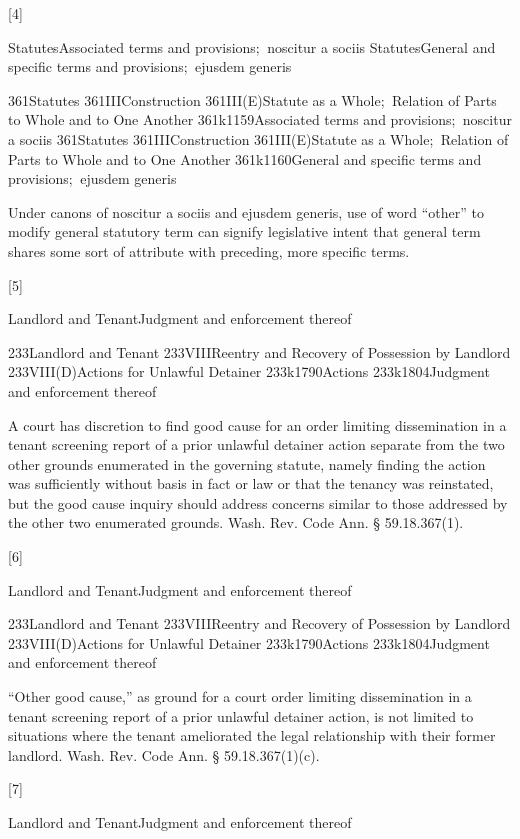 \documentclass[11pt]{article}
\begin{document}
[4]

StatutesAssociated terms and provisions;  noscitur a sociis
StatutesGeneral and specific terms and provisions;  ejusdem generis


361Statutes
361IIIConstruction
361III(E)Statute as a Whole;  Relation of Parts to Whole and to One Another
361k1159Associated terms and provisions;  noscitur a sociis
361Statutes
361IIIConstruction
361III(E)Statute as a Whole;  Relation of Parts to Whole and to One Another
361k1160General and specific terms and provisions;  ejusdem generis


Under canons of noscitur a sociis and ejusdem generis, use of word “other” to modify general statutory term can signify legislative intent that general term shares some sort of attribute with preceding, more specific terms.




[5]

Landlord and TenantJudgment and enforcement thereof


233Landlord and Tenant
233VIIIReentry and Recovery of Possession by Landlord
233VIII(D)Actions for Unlawful Detainer
233k1790Actions
233k1804Judgment and enforcement thereof


A court has discretion to find good cause for an order limiting dissemination in a tenant screening report of a prior unlawful detainer action separate from the two other grounds enumerated in the governing statute, namely finding the action was sufficiently without basis in fact or law or that the tenancy was reinstated, but the good cause inquiry should address concerns similar to those addressed by the other two enumerated grounds. Wash. Rev. Code Ann. § 59.18.367(1).




[6]

Landlord and TenantJudgment and enforcement thereof


233Landlord and Tenant
233VIIIReentry and Recovery of Possession by Landlord
233VIII(D)Actions for Unlawful Detainer
233k1790Actions
233k1804Judgment and enforcement thereof


“Other good cause,” as ground for a court order limiting dissemination in a tenant screening report of a prior unlawful detainer action, is not limited to situations where the tenant ameliorated the legal relationship with their former landlord. Wash. Rev. Code Ann. § 59.18.367(1)(c).




[7]

Landlord and TenantJudgment and enforcement thereof
\end{document}
